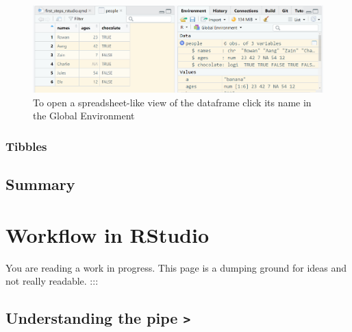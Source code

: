 \documentclass[
  letterpaper,
  DIV=11,
  numbers=noendperiod]{scrreprt}
\begin{document}
\begin{figure}

{\centering \includegraphics[width=8.33333in,height=\textheight]{images/view-dataframe.png}

}

\caption{\label{fig-view-dataframe}To open a spreadsheet-like view of
the dataframe click its name in the Global Environment}

\end{figure}

\hypertarget{tibbles}{%
\subsection{Tibbles}\label{tibbles}}

\hypertarget{summary}{%
\section{Summary}\label{summary}}

\hypertarget{workflow-in-rstudio}{%
\chapter{Workflow in RStudio}\label{workflow-in-rstudio}}

\begin{tcolorbox}[enhanced jigsaw, opacitybacktitle=0.6, toprule=.15mm, arc=.35mm, colback=white, colframe=quarto-callout-important-color-frame, opacityback=0, titlerule=0mm, colbacktitle=quarto-callout-important-color!10!white, leftrule=.75mm, breakable, bottomtitle=1mm, toptitle=1mm, title=\textcolor{quarto-callout-important-color}{\faExclamation}\hspace{0.5em}{Important}, rightrule=.15mm, bottomrule=.15mm, coltitle=black, left=2mm]

You are reading a work in progress. This page is a dumping ground for
ideas and not really readable. :::

\end{tcolorbox}

\hypertarget{understanding-the-pipe}{%
\section{\texorpdfstring{Understanding the pipe
\texttt{\textbar{}\textgreater{}}}{Understanding the pipe \textbar\textgreater{}}}\label{understanding-the-pipe}}
\end{document}
